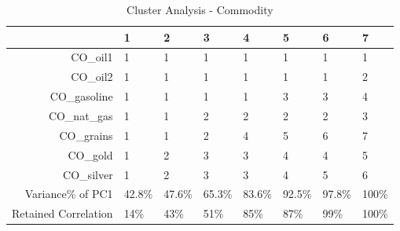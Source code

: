 \begin{longtable}{rlllllll}
\caption{Cluster Analysis - Commodity} \\ 
  \hline
 & 1 & 2 & 3 & 4 & 5 & 6 & 7 \\ 
  \hline
CO\_oil1 & 1 & 1 & 1 & 1 & 1 & 1 & 1 \\ 
  CO\_oil2 & 1 & 1 & 1 & 1 & 1 & 1 & 2 \\ 
  CO\_gasoline & 1 & 1 & 1 & 1 & 3 & 3 & 4 \\ 
  CO\_nat\_gas & 1 & 1 & 2 & 2 & 2 & 2 & 3 \\ 
  CO\_grains & 1 & 1 & 2 & 4 & 5 & 6 & 7 \\ 
  CO\_gold & 1 & 2 & 3 & 3 & 4 & 4 & 5 \\ 
  CO\_silver & 1 & 2 & 3 & 3 & 4 & 5 & 6 \\ 
  Variance\% of PC1 & 42.8\% & 47.6\% & 65.3\% & 83.6\% & 92.5\% & 97.8\% & 100\% \\ 
  Retained Correlation & 14\% & 43\% & 51\% & 85\% & 87\% & 99\% & 100\% \\ 
   \hline
\hline
\end{longtable}
